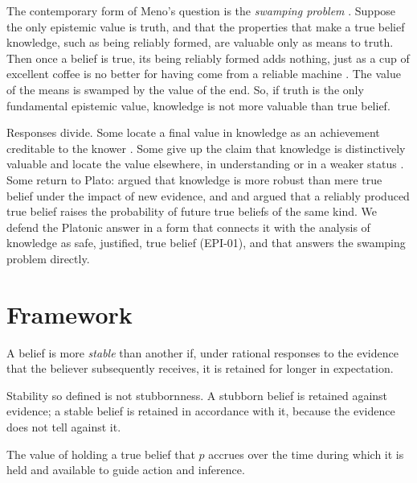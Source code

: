 \documentclass{situationist-preprint}
\begin{document}
The contemporary form of Meno's question is the \emph{swamping problem} \citep{Jones1997,Kvanvig2003,Zagzebski2003}. Suppose the only epistemic value is truth, and that the properties that make a true belief knowledge, such as being reliably formed, are valuable only as means to truth. Then once a belief is true, its being reliably formed adds nothing, just as a cup of excellent coffee is no better for having come from a reliable machine \citep{Zagzebski2003}. The value of the means is swamped by the value of the end. So, if truth is the only fundamental epistemic value, knowledge is not more valuable than true belief.

Responses divide. Some locate a final value in knowledge as an achievement creditable to the knower \citep{Greco2010,Sosa2007}. Some give up the claim that knowledge is distinctively valuable and locate the value elsewhere, in understanding \citep{Kvanvig2003} or in a weaker status \citep{PritchardMillarHaddock2010}. Some return to Plato: \citet[ch.~3]{Williamson2000} argued that knowledge is more robust than mere true belief under the impact of new evidence, and \citet{Olsson2007} and \citet{GoldmanOlsson2009} argued that a reliably produced true belief raises the probability of future true beliefs of the same kind. We defend the Platonic answer in a form that connects it with the analysis of knowledge as safe, justified, true belief (EPI-01), and that answers the swamping problem directly.

\section{Framework}

\begin{definition}[Stability]\label{d:stab}
A belief is more \emph{stable} than another if, under rational responses to the evidence that the believer subsequently receives, it is retained for longer in expectation.
\end{definition}

Stability so defined is not stubbornness. A stubborn belief is retained against evidence; a stable belief is retained in accordance with it, because the evidence does not tell against it.

\begin{principle}\label{p:temporal}
The value of holding a true belief that $p$ accrues over the time during which it is held and available to guide action and inference.
\end{principle}
\end{document}
